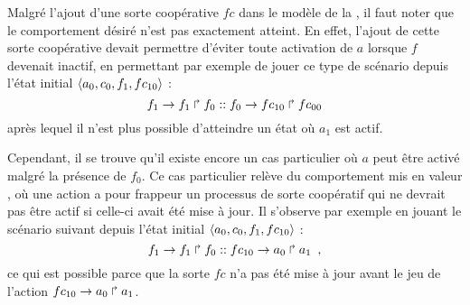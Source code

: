 
\begin{example}
  Malgré l'ajout d'une sorte coopérative $fc$ dans le modèle
  de la ,
  il faut noter que le comportement désiré n'est pas exactement atteint.
  En effet, l'ajout de cette sorte coopérative devait permettre d'éviter toute activation de $a$
  lorsque $f$ devenait inactif, en permettant par exemple de jouer ce type de scénario
  depuis l'état initial $\mbox{$\langle a_0, c_0, f_1, fc_{10} \rangle$}$ :
    \[f_1\rightarrow f_1\Rsh f_0 :: f_0\rightarrow fc_{10}\Rsh fc_{00}\]
  après lequel il n'est plus possible d'atteindre un état où $a_1$ est actif.
  
  Cependant, il se trouve qu'il existe encore un cas particulier où $a$ peut être activé
  malgré la présence de $f_0$.
  Ce cas particulier relève du comportement mis en valeur ,
  où une action a pour frappeur un processus de sorte coopératif qui ne devrait pas être
  actif si celle-ci avait été mise à jour.
  Il s'observe par exemple en jouant le scénario suivant depuis l'état initial
  $\mbox{$\langle a_0, c_0, f_1, fc_{10} \rangle$}$ :
    \[f_1\rightarrow f_1\Rsh f_0 :: fc_{10}\rightarrow a_0\Rsh a_1 \enspace,\]
  ce qui est possible parce que la sorte $fc$ n'a pas été mise à jour avant le jeu
  de l'action $fc_{10}\rightarrow a_0\Rsh a_1$.
\end{example}

